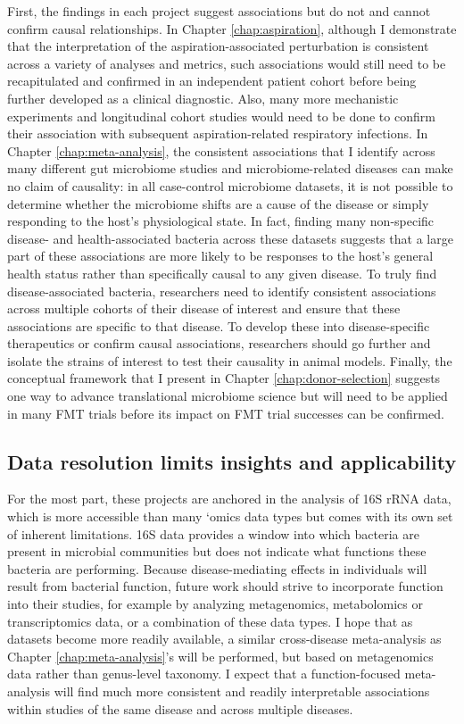 First, the findings in each project suggest associations but do not and cannot confirm causal relationships.
In Chapter \ref{chap:aspiration}, although I demonstrate that the interpretation of the aspiration-associated perturbation is consistent across a variety of analyses and metrics, such associations would still need to be recapitulated and confirmed in an independent patient cohort before being further developed as a clinical diagnostic.
Also, many more mechanistic experiments and longitudinal cohort studies would need to be done to confirm their association with subsequent aspiration-related respiratory infections.
In Chapter \ref{chap:meta-analysis}, the consistent associations that I identify across many different gut microbiome studies and microbiome-related diseases can make no claim of causality: in all case-control microbiome datasets, it is not possible to determine whether the microbiome shifts are a cause of the disease or simply responding to the host's physiological state.
In fact, finding many non-specific disease- and health-associated bacteria across these datasets suggests that a large part of these associations are more likely to be responses to the host's general health status rather than specifically causal to any given disease.
To truly find disease-associated bacteria, researchers need to identify consistent associations across multiple cohorts of their disease of interest and ensure that these associations are specific to that disease.
To develop these into disease-specific therapeutics or confirm causal associations, researchers should go further and isolate the strains of interest to test their causality in animal models.
Finally, the conceptual framework that I present in Chapter \ref{chap:donor-selection} suggests one way to advance translational microbiome science but will need to be applied in many FMT trials before its impact on FMT trial successes can be confirmed.

\subsection{Data resolution limits insights and applicability}

For the most part, these projects are anchored in the analysis of 16S rRNA data, which is more accessible than many `omics data types but comes with its own set of inherent limitations.
16S data provides a window into which bacteria are present in microbial communities but does not indicate what functions these bacteria are performing.
Because disease-mediating effects in individuals will result from bacterial function, future work should strive to incorporate function into their studies, for example by analyzing metagenomics, metabolomics or transcriptomics data, or a combination of these data types.
I hope that as datasets become more readily available, a similar cross-disease meta-analysis as Chapter \ref{chap:meta-analysis}'s will be performed, but based on metagenomics data rather than genus-level taxonomy.
I expect that a function-focused meta-analysis will find much more consistent and readily interpretable associations within studies of the same disease and across multiple diseases.

